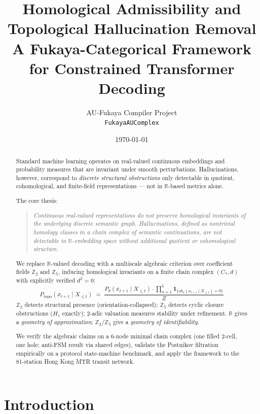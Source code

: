 \documentclass[11pt,a4paper]{article}
\title{%
  \textbf{Homological Admissibility and Topological Hallucination Removal}\\[6pt]
  \large A Fukaya-Categorical Framework for Constrained Transformer Decoding
}
\author{
  AU-Fukaya Compiler Project\\
  \texttt{FukayaAUComplex}
}
\date{\today}
\begin{document}
\maketitle

\begin{abstract}
Standard machine learning operates on real-valued continuous embeddings
and probability measures that are invariant under smooth perturbations.
Hallucinations, however, correspond to \emph{discrete structural
obstructions} only detectable in quotient, cohomological, and
finite-field representations --- not in $\mathbb{R}$-based metrics alone.

The core thesis:
\begin{quote}
\emph{Continuous real-valued representations do not preserve homological
invariants of the underlying discrete semantic graph.
Hallucinations, defined as nontrivial homology classes in a chain
complex of semantic continuations, are not detectable in
$\mathbb{R}$-embedding space without additional quotient or
cohomological structure.}
\end{quote}

We replace $\mathbb{R}$-valued decoding with a multiscale algebraic
criterion over coefficient fields $\mathbb{Z}_2$ and $\mathbb{Z}_5$,
inducing homological invariants on a finite chain complex $(C_*, d)$
with explicitly verified $d^2 = 0$:
\[
P_{\mathrm{topo}}(x_{t+1} \mid X_{\leq t})
\;=\;
\frac{P_\theta(x_{t+1} \mid X_{\leq t})
  \cdot \prod_{n=1}^{5}\mathbf{1}_{\{ob_n(x_{t+1}\mid X_{\leq t})=0\}}}
     {Z}
\]
$\mathbb{Z}_2$ detects structural presence (orientation-collapsed);
$\mathbb{Z}_5$ detects cyclic closure obstructions ($H_1$ exactly);
2-adic valuation measures stability under refinement.
$\mathbb{R}$ gives a \emph{geometry of approximation};
$\mathbb{Z}_2$/$\mathbb{Z}_5$ give a \emph{geometry of identifiability}.

We verify the algebraic claims on a 6-node minimal chain complex
(one filled 2-cell, one hole; anti-FSM result via shared edges),
validate the Postnikov filtration empirically on a protocol
state-machine benchmark, and apply the framework to the 81-station
Hong Kong MTR transit network.
\end{abstract}

\tableofcontents
\newpage

\section{Introduction}
\end{document}
